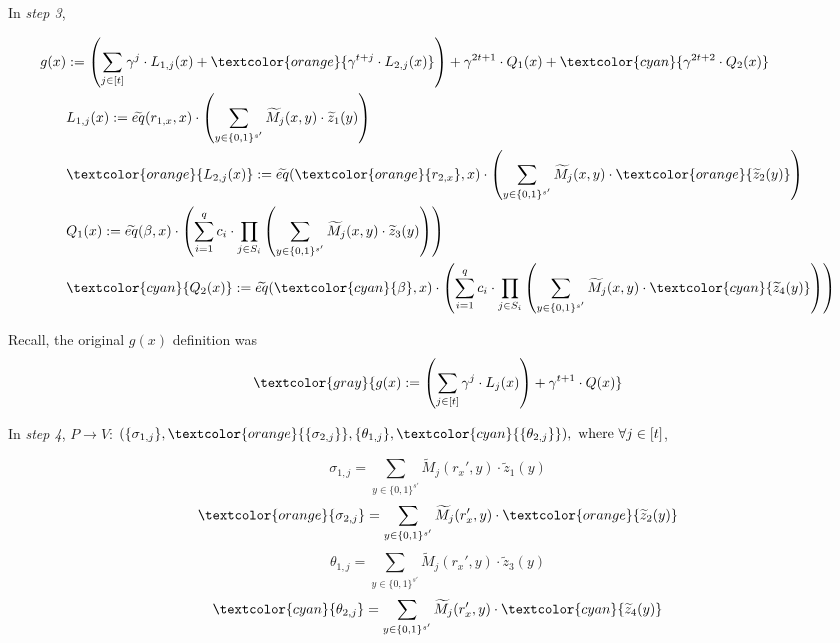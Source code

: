 \documentclass{beamer}
\begin{document}
\begin{tiny}
\begin{frame}
  In \emph{step 3},

\begin{align*}
	g(x) &:= \left( \sum_{j \in [t]} \gamma^j \cdot L_{1,j}(x) + \textcolor{orange}{\gamma^{t+j} \cdot L_{2,j}(x)} \right)
+ \gamma^{2t+1} \cdot Q_1(x) + \textcolor{cyan}{\gamma^{2t+2} \cdot Q_2(x)} \\
	     &L_{1,j}(x) := \widetilde{eq}(r_{1,x}, x) \cdot \left(
	\sum_{y \in \{0,1\}^{s'}} \widetilde{M}_j(x, y) \cdot \widetilde{z}_1(y)
\right)\\
	     &\textcolor{orange}{L_{2,j}(x)} := \widetilde{eq}(\textcolor{orange}{r_{2,x}}, x) \cdot \left(
	\sum_{y \in \{0,1\}^{s'}} \widetilde{M}_j(x, y) \cdot \textcolor{orange}{\widetilde{z}_2(y)}
\right)\\
	     &Q_1(x) := \widetilde{eq}(\beta, x) \cdot \left(
\sum_{i=1}^q c_i \cdot \prod_{j \in S_i} \left( \sum_{y \in \{0, 1\}^{s'}} \widetilde{M}_j(x, y) \cdot \widetilde{z}_3(y) \right)\right)\\
	     &\textcolor{cyan}{Q_2(x)} := \widetilde{eq}(\textcolor{cyan}{\beta}, x) \cdot \left(
	\sum_{i=1}^q c_i \cdot \prod_{j \in S_i} \left( \sum_{y \in \{0, 1\}^{s'}} \widetilde{M}_j(x, y) \cdot \textcolor{cyan}{\widetilde{z}_4(y)} \right)\right)
\end{align*}


Recall, the original $g(x)$ definition was
$$\textcolor{gray}{g(x) := \left( \sum_{j \in [t]} \gamma^j \cdot L_j(x) \right) + \gamma^{t+1} \cdot Q(x)}$$


\end{frame}

\begin{frame}
  In \emph{step 4}, $P \rightarrow V$: $(\{\sigma_{1,j}\}, \textcolor{orange}{\{\sigma_{2,j}\}}, \{\theta_{1,j}\}, \textcolor{cyan}{\{\theta_{2,j}\}}),~ \text{where} ~\forall j \in [t]$,

$$\sigma_{1,j} = \sum_{y \in \{0,1\}^{s'}} \widetilde{M}_j(r_x', y) \cdot \widetilde{z}_1(y)$$
$$\textcolor{orange}{\sigma_{2,j}} = \sum_{y \in \{0,1\}^{s'}} \widetilde{M}_j(r_x', y) \cdot \textcolor{orange}{\widetilde{z}_2(y)}$$
$$\theta_{1,j} = \sum_{y \in \{0, 1\}^{s'}} \widetilde{M}_j(r_x', y) \cdot \widetilde{z}_3(y)$$
$$\textcolor{cyan}{\theta_{2,j}} = \sum_{y \in \{0, 1\}^{s'}} \widetilde{M}_j(r_x', y) \cdot \textcolor{cyan}{\widetilde{z}_4(y)}$$


\end{frame}
\end{tiny}
\end{document}
